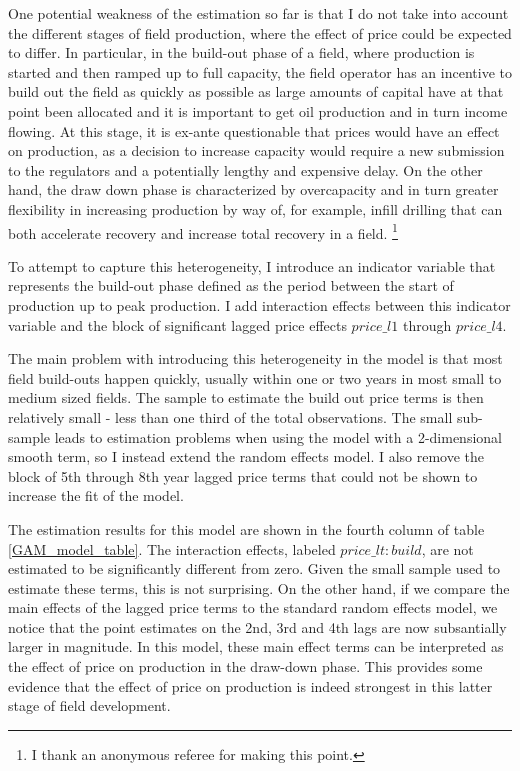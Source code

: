 \documentclass[12pt]{article}
\begin{document}
One potential weakness of the estimation so far is that I do not take into account the different stages of field production, where the effect of price could be expected to differ. 
In particular, in the build-out phase of a field, where production is started and then ramped up to full capacity, the field operator has an incentive to build out the field as quickly as possible as large amounts of capital have at that point been allocated and it is important to get oil production and in turn income flowing. At this stage, it is ex-ante questionable that prices would have an effect on production, as a decision to increase capacity would require a new submission to the regulators and a potentially lengthy and expensive delay. On the other hand, the draw down phase is characterized by overcapacity and in turn greater flexibility in increasing production by way of, for example, infill drilling that can both accelerate recovery and increase total recovery in a field. \footnote{I thank an anonymous referee for making this point.}

To attempt to capture this heterogeneity, I introduce an indicator variable that represents the build-out phase defined as the period between the start of production up to peak production. I add interaction effects between this indicator variable and the block of significant lagged price effects $price\_l1$ through $price\_l4$.

The main problem with introducing this heterogeneity in the model is that most field build-outs happen quickly, usually within one or two years in most small to medium sized fields. The sample to estimate the build out price terms is then relatively small - less than one third of the total observations. The small sub-sample leads to estimation problems when using the model with a 2-dimensional smooth term, so I instead extend the random effects model. I also remove the block of 5th through 8th year lagged price terms that could not be shown to increase the fit of the model.

The estimation results for this model are shown in the fourth column of table \ref{GAM_model_table}. The interaction effects, labeled $price\_lt:build$, are not estimated to be significantly different from zero. Given the small sample used to estimate these terms, this is not surprising. On the other hand, if we compare the main effects of the lagged price terms to the standard random effects model, we notice that the point estimates on the 2nd, 3rd and 4th lags are now subsantially larger in magnitude. In this model, these main effect terms can be interpreted as the effect of price on production in the draw-down phase. This provides some evidence that the effect of price on production is indeed strongest in this latter stage of field development.
\end{document}
